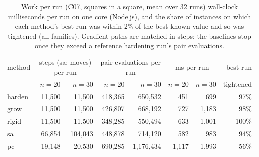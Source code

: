 \begin{table}[h]\centering\small
\begin{tabular}{lrrrrrrr}
\toprule
method & \multicolumn{2}{c}{steps (sa: moves) per run} & \multicolumn{2}{c}{pair evaluations per run} & \multicolumn{2}{c}{ms per run} & best run \\
 & $n=20$ & $n=30$ & $n=20$ & $n=30$ & $n=20$ & $n=30$ & tightened \\
\midrule
harden & 11{,}500 & 11{,}500 & 418{,}365 & 650{,}532 & 451 & 699 & 97\% \\
grow & 11{,}500 & 11{,}500 & 426{,}807 & 668{,}192 & 727 & 1{,}183 & 98\% \\
rigid & 11{,}500 & 11{,}500 & 348{,}285 & 550{,}494 & 633 & 1{,}001 & 100\% \\
sa & 66{,}854 & 104{,}043 & 448{,}878 & 714{,}120 & 582 & 983 & 94\% \\
pc & 19{,}148 & 20{,}530 & 690{,}285 & 1{,}176{,}434 & 1{,}117 & 1{,}993 & 56\% \\
\bottomrule
\end{tabular}
\caption{Work per run (C07, squares in a square, mean over 32 runs) wall-clock milliseconds per run on one core (Node.js), and the share of instances on which each method's best run was within 2\% of the best known value and so was tightened (all families). Gradient paths are matched in steps; the baselines stop once they exceed a reference hardening run's pair evaluations.}\label{tab:diag}
\end{table}
